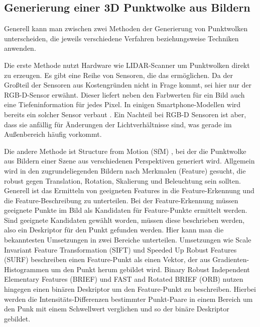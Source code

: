 \documentclass[12pt,titlepage, twoside]{article}
\begin{document}
\subsection{Generierung einer 3D Punktwolke aus Bildern}
\label{sec:stand:pointcloud}

Generell kann man zwischen zwei Methoden der Generierung von Punktwolken unterscheiden, die jeweils verschiedene Verfahren beziehungsweise Techniken anwenden.

Die erste Methode nutzt Hardware wie LIDAR-Scanner \cite{lidar} um Punktwolken direkt zu erzeugen. Es gibt eine Reihe von Sensoren, die das ermöglichen. 
Da der Großteil der Sensoren aus Kostengründen nicht in Frage kommt, sei hier nur der RGB-D-Sensor erwähnt. 
Dieser liefert neben den Farbwerten für ein Bild auch eine Tiefeninformation für jedes Pixel. In einigen Smartphone-Modellen wird bereits ein solcher Sensor verbaut \cite{rgbd_smartphones}.
Ein Nachteil bei RGB-D Sensoren ist aber, dass sie anfällig für Änderungen der Lichtverhältnisse sind, was gerade im Außenbereich häufig vorkommt.

Die andere Methode ist Structure from Motion (SfM) \cite{sfm}, bei der die Punktwolke aus Bildern einer Szene aus verschiedenen Perspektiven generiert wird. 
Allgemein wird in den zugrundeliegenden Bildern nach Merkmalen (Feature) gesucht, die robust gegen Translation, Rotation, Skalierung und Beleuchtung sein sollten. 
Generell ist das Ermitteln von geeigneten Features in die Feature-Erkennung und die Feature-Beschreibung zu unterteilen. 
Bei der Feature-Erkennung müssen geeignete Punkte im Bild als Kandidaten für Feature-Punkte ermittelt werden. 
Sind geeignete Kandidaten gewählt worden, müssen diese beschrieben werden, also ein Deskriptor für den Punkt gefunden werden. Hier kann man die bekanntesten Umsetzungen in zwei Bereiche unterteilen. 
Umsetzungen wie Scale Invariant Feature Transformation (SIFT) \cite{Sift} und Speeded Up Robust Features (SURF) \cite{SURF} beschreiben einen Feature-Punkt als einen Vektor, der aus Gradienten-Histogrammen um den Punkt herum gebildet wird.
Binary Robust Independent Elementary Features (BRIEF) \cite{BRIEF} und FAST and Rotated BRIEF (ORB) \cite{ORB} nutzen hingegen einen binären Deskriptor um den Feature-Punkt zu beschreiben. 
Hierbei werden die Intensitäts-Differenzen bestimmter Punkt-Paare in einem Bereich um den Punk mit einem Schwellwert verglichen und so der binäre Deskriptor gebildet.
\end{document}
